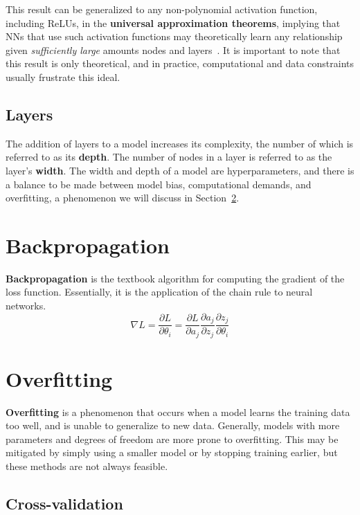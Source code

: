 \documentclass[12pt]{report}
\theoremstyle{definition}
\theoremstyle{remark}
\begin{document}
This result can be generalized to any non-polynomial activation function, including ReLUs, in the \textbf{universal approximation theorems}, implying that NNs that use such activation functions may theoretically learn any relationship given \textit{sufficiently large} amounts nodes and layers~\cite{hornik_multilayer_1989, kidger_universal_2020, pinkus_approximation_1999}. It is important to note that this result is only theoretical, and in practice, computational and data constraints usually frustrate this ideal.

\subsection{Layers}

The addition of layers to a model increases its complexity, the number of which is referred to as its \textbf{depth}. The number of nodes in a layer is referred to as the layer's \textbf{width}. The width and depth of a model are hyperparameters, and there is a balance to be made between model bias, computational demands, and overfitting, a phenomenon we will discuss in Section~\ref{sec:overfitting}.
\section{Backpropagation}

\textbf{Backpropagation} is the textbook algorithm for computing the gradient of the loss function. Essentially, it is the application of the chain rule to neural networks.
\begin{equation}
    \nabla L = \frac{\partial L}{\partial \theta_i} = \frac{\partial L}{\partial a_j} \frac{\partial a_j}{\partial z_j} \frac{\partial z_j}{\partial \theta_i}
\end{equation}

\section{Overfitting}\label{sec:overfitting}
\textbf{Overfitting} is a phenomenon that occurs when a model learns the training data too well, and is unable to generalize to new data. Generally, models with more parameters and degrees of freedom are more prone to overfitting. This may be mitigated by simply using a smaller model or by stopping training earlier, but these methods are not always feasible.

\subsection{Cross-validation}
\end{document}

